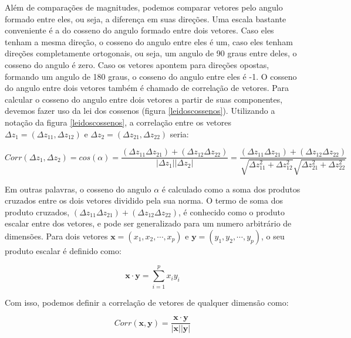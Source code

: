 \documentclass[portuges,]{tufte-handout}
\begin{document}
Além de comparações de magnitudes, podemos comparar vetores pelo angulo
formado entre eles, ou seja, a diferença em suas direções. Uma escala
bastante conveniente é a do cosseno do angulo formado entre dois
vetores. Caso eles tenham a mesma direção, o cosseno do angulo entre
eles é um, caso eles tenham direções completamente ortogonais, ou seja,
um angulo de 90 graus entre deles, o cosseno do angulo é zero. Caso os
vetores apontem para direções opostas, formando um angulo de 180 graus,
o cosseno do angulo entre eles é -1. O cosseno do angulo entre dois
vetores também é chamado de correlação de vetores. Para calcular o
cosseno do angulo entre dois vetores a partir de suas componentes,
devemos fazer uso da lei dos cossenos (figura \ref{leidoscossenos}).
Utilizando a notação da figura \ref{leidoscossenos}, a correlação entre
os vetores \(\Delta z_1 = (\Delta z_{11}, \Delta z_{12})\) e
\(\Delta z_2 = (\Delta z_{21}, \Delta z_{22})\) seria:

\[
Corr(\Delta z_1, \Delta z_2) = cos(\alpha) = \frac{(\Delta z_{11}  \Delta z_{21}) + (\Delta z_{12}  \Delta z_{22})}{| \Delta z_1|  | \Delta z_2|} = \frac{(\Delta z_{11}  \Delta z_{21}) + (\Delta z_{12}  \Delta z_{22})}{\sqrt{\Delta z_{11}^2 + \Delta z_{12}^2}  \sqrt{\Delta z_{21}^2 + \Delta z_{22}^2}}
\]

Em outras palavras, o cosseno do angulo \(\alpha\) é calculado como a
soma dos produtos cruzados entre os dois vetores dividido pela sua
norma. O termo de soma dos produto cruzados,
\((\Delta z_{11} \Delta z_{21}) + (\Delta z_{12} \Delta z_{22})\), é
conhecido como o produto escalar entre dos vetores, e pode ser
generalizado para um numero arbitrário de dimensões. Para dois vetores
\(\mathbf{x} = (x_1, x_2, \cdots, x_p)\) e
\(\mathbf{y} = (y_1, y_2, \cdots, y_p)\), o seu produto escalar é
definido como:

\[
\mathbf{x} \cdot \mathbf{y} = \sum_{i=1}^p x_iy_i
\]

Com isso, podemos definir a correlação de vetores de qualquer dimensão
como:

\[
Corr(\mathbf{x}, \mathbf{y}) = \frac{\mathbf{x} \cdot \mathbf{y}}{|\mathbf{x}||\mathbf{y}|}
\]
\end{document}
